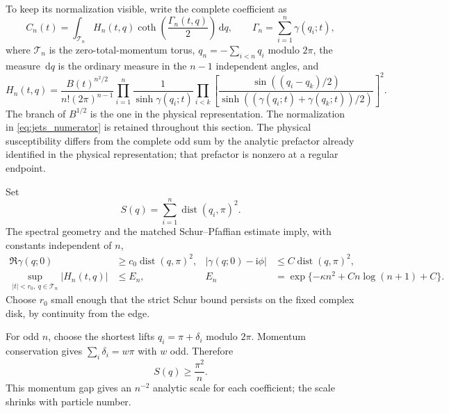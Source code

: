 \documentclass[11pt]{article}
\numberwithin{equation}{section}
\theoremstyle{definition}
\newcommand{\dd}{\,\mathrm d}
\newcommand{\ii}{\mathrm i}
\newcommand{\dist}{\operatorname{dist}}
\begin{document}
To keep its normalization visible, write the complete coefficient as
\begin{equation}\label{eq:jets_full_coefficient}
 C_n(t)=\int_{\mathcal T_n}H_n(t,q)
        \coth\!\left(\frac{\Gamma_n(t,q)}2\right)\dd q,
 \qquad \Gamma_n=\sum_{i=1}^n\gamma(q_i;t),
\end{equation}
where $\mathcal T_n$ is the zero-total-momentum torus,
$q_n=-\sum_{i<n}q_i$ modulo $2\pi$, the measure $\dd q$ is the
ordinary measure in the $n-1$ independent angles, and
\begin{equation}\label{eq:jets_numerator}
 H_n(t,q)=\frac{B(t)^{n^2/2}}{n!(2\pi)^{n-1}}
 \prod_{i=1}^n\frac1{\sinh\gamma(q_i;t)}
 \prod_{i<k}\left[
  \frac{\sin((q_i-q_k)/2)}
       {\sinh((\gamma(q_i;t)+\gamma(q_k;t))/2)}
 \right]^2.
\end{equation}
The branch of $B^{1/2}$ is the one in the physical representation. The
normalization in \eqref{eq:jets_numerator} is retained throughout this
section. The physical susceptibility differs from the complete odd sum
by the analytic prefactor already identified in the physical
representation; that prefactor is nonzero at a regular endpoint.

Set
\[
 S(q)=\sum_{i=1}^n\dist(q_i,\pi)^2.
\]
The spectral geometry and the matched Schur--Pfaffian estimate imply,
with constants independent of $n$,
\begin{align}
 \Re\gamma(q;0)&\ge c_0\dist(q,\pi)^2,
 &|\gamma(q;0)-\ii\phi|&\le C\dist(q,\pi)^2,\label{eq:jets_attenuation0}\\
 \sup_{|t|<r_0,\ q\in\mathcal T_n}|H_n(t,q)|
 &\le E_n,
 &E_n&=\exp\{-\kappa n^2+C n\log(n+1)+C\}.
 \label{eq:jets_gaussian_num}
\end{align}
Choose $r_0$ small enough that the strict Schur bound persists on
the fixed complex disk, by continuity from the edge.

For odd $n$, choose the shortest lifts $q_i=\pi+\delta_i$ modulo
$2\pi$. Momentum conservation gives
$\sum_i\delta_i=w\pi$ with $w$ odd. Therefore
\begin{equation}\label{eq:jets_momentum_minimum}
 S(q)\ge\frac{\pi^2}{n}.
\end{equation}
This momentum gap gives an $n^{-2}$ analytic scale for each coefficient;
the scale shrinks with particle number.
\end{document}
